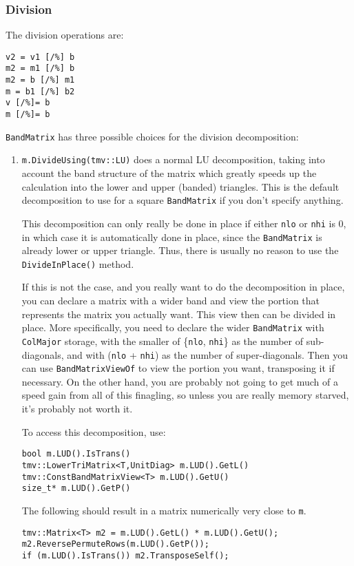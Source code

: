 \documentclass[twoside,letterpaper,11pt]{article}
\renewcommand{\tt}[1]{{\texttt {#1}}}
\begin{document}
\subsubsection{Division}

The division operations are:
\begin{verbatim}
v2 = v1 [/%] b
m2 = m1 [/%] b
m2 = b [/%] m1
m = b1 [/%] b2
v [/%]= b
m [/%]= b
\end{verbatim}

\tt{BandMatrix} has three possible choices for the division decomposition:
\begin{enumerate}
\item
\tt{m.DivideUsing(tmv::LU)} does a normal LU decomposition,
taking into account the band structure of the matrix which greatly speeds up 
the calculation into the lower and upper (banded) triangles.
This is the default decomposition to use for a square \tt{BandMatrix} 
if you don't specify anything.

This decomposition can only really
be done in place if either \tt{nlo} or \tt{nhi} is 0,
in which case it is automatically done in place,
since the \tt{BandMatrix} is already lower or upper triangle.
Thus, there is usually no reason to use the \tt{DivideInPlace()} method.

If this is not the case, and you really want to do the decomposition in place, you can
declare a matrix with a wider band and view the portion that represents the matrix
you actually want.  This view then can be divided in place.  More specifically,
you need to declare the wider \tt{BandMatrix} with \tt{ColMajor} storage,
with the smaller of
\{\tt{nlo}, \tt{nhi}\} as the number of sub-diagonals, and with 
(\tt{nlo} + \tt{nhi}) as the number of super-diagonals.  
Then you can use \tt{BandMatrixViewOf} to view the portion you want, transposing it if
necessary.  On the other hand, you are probably not going to get much of a speed gain 
from all of this finagling, so unless you are really memory starved, it's probably not worth it.

To access this decomposition, use:
\begin{verbatim}
bool m.LUD().IsTrans()
tmv::LowerTriMatrix<T,UnitDiag> m.LUD().GetL()
tmv::ConstBandMatrixView<T> m.LUD().GetU()
size_t* m.LUD().GetP()
\end{verbatim}
The following should result in a matrix numerically very close to \tt{m}.
\begin{verbatim}
tmv::Matrix<T> m2 = m.LUD().GetL() * m.LUD().GetU();
m2.ReversePermuteRows(m.LUD().GetP());
if (m.LUD().IsTrans()) m2.TransposeSelf();
\end{verbatim}


\end{enumerate}
\end{document}
